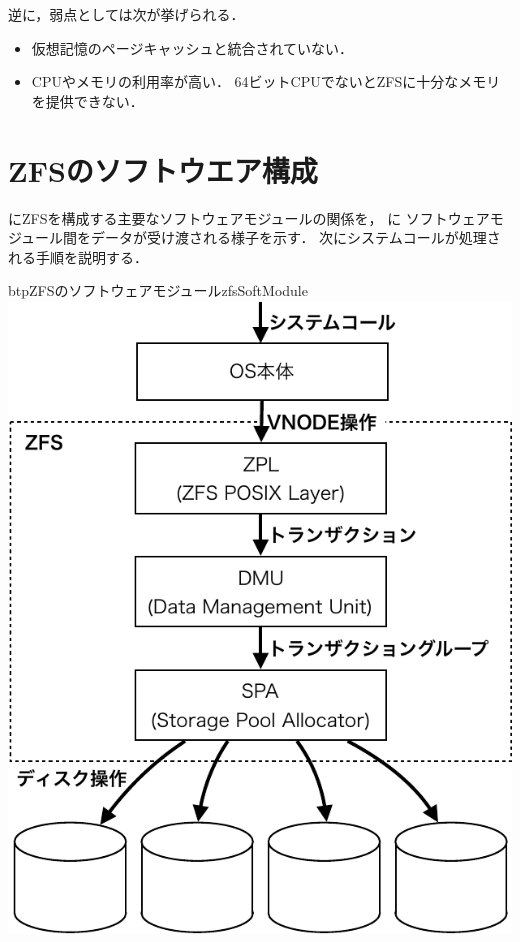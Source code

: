 逆に，弱点としては次が挙げられる．
\begin{itemize}
\item 仮想記憶のページキャッシュと統合されていない．
\item CPUやメモリの利用率が高い．
  64ビットCPUでないとZFSに十分なメモリを提供できない．
\end{itemize}

\section{ZFSのソフトウエア構成}
にZFSを構成する主要なソフトウェアモジュールの関係を，
に
ソフトウェアモジュール間をデータが受け渡される様子を示す．
次にシステムコールが処理される手順を説明する．

\begin{myfig}{btp}{ZFSのソフトウェアモジュール}{zfsSoftModule}
  \centering\includegraphics[scale=0.65]{Fig/zfsSoftModule-crop.pdf}
\end{myfig}
  
